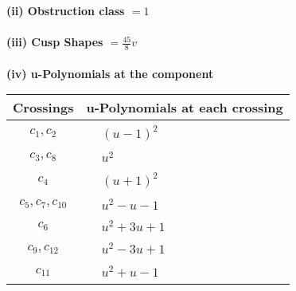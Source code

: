 \documentclass[1p]{elsarticle_modified}
\theoremstyle{definition}
\begin{document}
\flushleft \textbf{(ii) Obstruction class $= 1$}\\~\\
\flushleft \textbf{(iii) Cusp Shapes $= \frac{45}{8} v$}\\~\\
\newpage\renewcommand{\arraystretch}{1}
\flushleft \textbf{(iv) u-Polynomials at the component}\newline \\
\begin{tabular}{m{50pt}|m{274pt}}
Crossings & \hspace{64pt}u-Polynomials at each crossing \\
\hline $$\begin{aligned}c_{1},c_{2}\end{aligned}$$&$\begin{aligned}
&(u-1)^2
\end{aligned}$\\
\hline $$\begin{aligned}c_{3},c_{8}\end{aligned}$$&$\begin{aligned}
&u^2
\end{aligned}$\\
\hline $$\begin{aligned}c_{4}\end{aligned}$$&$\begin{aligned}
&(u+1)^2
\end{aligned}$\\
\hline $$\begin{aligned}c_{5},c_{7},c_{10}\end{aligned}$$&$\begin{aligned}
&u^2- u-1
\end{aligned}$\\
\hline $$\begin{aligned}c_{6}\end{aligned}$$&$\begin{aligned}
&u^2+3 u+1
\end{aligned}$\\
\hline $$\begin{aligned}c_{9},c_{12}\end{aligned}$$&$\begin{aligned}
&u^2-3 u+1
\end{aligned}$\\
\hline $$\begin{aligned}c_{11}\end{aligned}$$&$\begin{aligned}
&u^2+u-1
\end{aligned}$\\
\hline
\end{tabular}\\~\\
\end{document}
